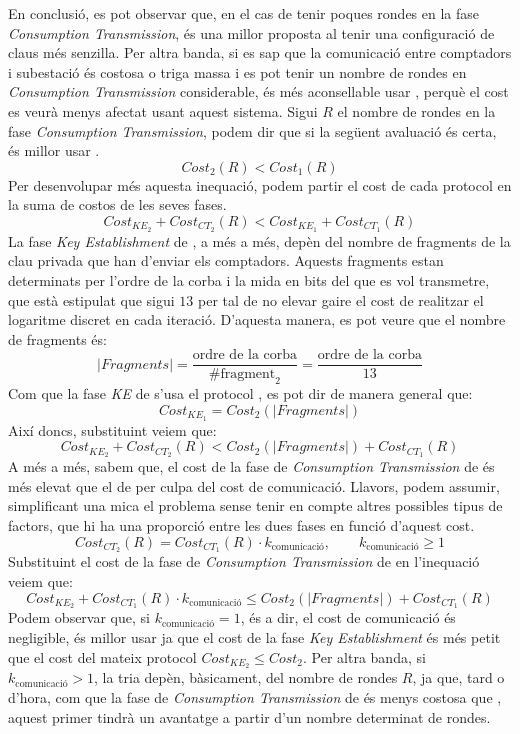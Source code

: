 En conclusió, es pot observar que, en el cas de tenir poques rondes en la fase \textit{Consumption Transmission}, \cite{busom} és una millor proposta al tenir una configuració de claus més senzilla. 
Per altra banda, si es sap que la comunicació entre comptadors i subestació és costosa o triga massa  i es pot tenir un nombre de rondes en \textit{Consumption Transmission} considerable, és més aconsellable usar \cite{recsi}, perquè el cost es veurà menys afectat usant aquest sistema. Sigui $R$ el nombre de rondes en la fase \textit{Consumption Transmission}, podem dir que si la següent avaluació és certa, és millor usar \cite{busom}.
\[Cost_2(R) < Cost_1(R)\]
Per desenvolupar més aquesta inequació, podem partir el cost de cada protocol en la suma de costos de les seves fases.
\[Cost_{KE_2} + Cost_{CT_2}(R) <  Cost_{KE_1} + Cost_{CT_1}(R)\]
La fase \textit{Key Establishment} de \cite{recsi}, a més a més, depèn del nombre de fragments de la clau privada que han d'enviar els comptadors. Aquests fragments estan determinats per l'ordre de la corba i la mida en bits del que es vol transmetre, que està estipulat que sigui $13$ per tal de no elevar gaire el cost de realitzar el logaritme discret en cada iteració. D'aquesta manera, es pot veure que el nombre de fragments és: 
\[|Fragments| = \frac{\textrm{ordre de la corba}}{\#\textrm{fragment}_2} = \frac{\textrm{ordre de la corba}}{13}\]
Com que la fase \textit{KE} de \cite{recsi} s'usa el protocol \cite{busom}, es pot dir de manera general que:
\[Cost_{KE_1} = Cost_2(|Fragments|)\]
Així doncs, substituint veiem que:
\[Cost_{KE_2} + Cost_{CT_2}(R) <  Cost_{2}(|Fragments|) + Cost_{CT_1}(R)\]
A més a més, sabem que, el cost de la fase de \textit{Consumption Transmission} de \cite{busom} és més elevat que el de \cite{recsi} per culpa del cost de comunicació. Llavors, podem assumir, simplificant una mica el problema sense tenir en compte altres possibles tipus de factors, que hi ha una proporció entre les dues fases en funció d'aquest cost.
\[Cost_{CT_2}(R) = Cost_{CT_1}(R) \cdot k_{\textrm{comunicació}}, \qquad k_{\textrm{comunicació}} \ge 1\]
Substituint el cost de la fase de \textit{Consumption Transmission} de \cite{busom} en l'inequació veiem que:
\[Cost_{KE_2} + Cost_{CT_1}(R) \cdot k_{\textrm{comunicació}} \le  Cost_{2}(|Fragments|) + Cost_{CT_1}(R)\]
Podem observar que, si $k_{\textrm{comunicació}} = 1$, és  a dir, el cost de comunicació és negligible, és millor usar \cite{busom} ja que el cost de la fase \textit{Key Establishment} és més petit que el cost del mateix protocol $Cost_{KE_2} \le Cost_{2}$. Per altra banda, si $k_{\textrm{comunicació}} > 1$, la tria depèn, bàsicament, del nombre de rondes $R$, ja que, tard o d'hora, com que la fase de \textit{Consumption Transmission} de \cite{recsi} és menys costosa que \cite{busom}, aquest primer tindrà un avantatge a partir d'un nombre determinat de rondes.

